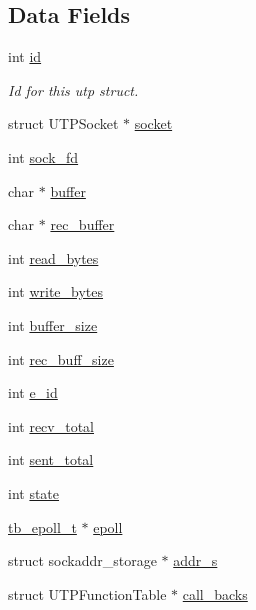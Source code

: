 \subsection*{Data Fields}
\begin{DoxyCompactItemize}
\item 
int \hyperlink{structtb__utp__t_a7441ef0865bcb3db9b8064dd7375c1ea}{id}
\begin{DoxyCompactList}\small\item\em Id for this utp struct. \end{DoxyCompactList}\item 
struct U\-T\-P\-Socket $\ast$ \hyperlink{structtb__utp__t_add15e39a83c7a0c72140c305bdd386d0}{socket}
\item 
int \hyperlink{structtb__utp__t_a514331e6141a28289f8ddead55eadebd}{sock\-\_\-fd}
\item 
char $\ast$ \hyperlink{structtb__utp__t_aff2566f4c366b48d73479bef43ee4d2e}{buffer}
\item 
char $\ast$ \hyperlink{structtb__utp__t_a2e6fac18f9532108c2aa44a52d3c6d67}{rec\-\_\-buffer}
\item 
int \hyperlink{structtb__utp__t_aeb56438a9cac1febce2dcddd6c404759}{read\-\_\-bytes}
\item 
int \hyperlink{structtb__utp__t_a814ec097a6a396e10f9f0924e924684e}{write\-\_\-bytes}
\item 
int \hyperlink{structtb__utp__t_af22ff4ab7a026e6c3b4b08eafb2df027}{buffer\-\_\-size}
\item 
int \hyperlink{structtb__utp__t_a57c1edf513c216e498e37e3428180480}{rec\-\_\-buff\-\_\-size}
\item 
int \hyperlink{structtb__utp__t_ae2ab59af76be940892170990721a0832}{e\-\_\-id}
\item 
int \hyperlink{structtb__utp__t_abf192d5591e28d37f0795a6c730a9a5b}{recv\-\_\-total}
\item 
int \hyperlink{structtb__utp__t_a8cb5bfce3dd82afd8155aae9c7328441}{sent\-\_\-total}
\item 
int \hyperlink{structtb__utp__t_a89f234133d3efe315836311cbf21c64b}{state}
\item 
\hyperlink{structtb__epoll__t}{tb\-\_\-epoll\-\_\-t} $\ast$ \hyperlink{structtb__utp__t_af7fbbda1b15f6051fb8cead0ada5ce7e}{epoll}
\item 
struct sockaddr\-\_\-storage $\ast$ \hyperlink{structtb__utp__t_a6c6b934648a67540d62892076f229e35}{addr\-\_\-s}
\item 
struct U\-T\-P\-Function\-Table $\ast$ \hyperlink{structtb__utp__t_af8b7b669057336d848a5117e4232a83a}{call\-\_\-backs}

\end{DoxyCompactItemize}
